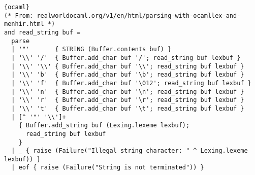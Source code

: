 \begin{lstlisting}{ocaml}
(* From: realworldocaml.org/v1/en/html/parsing-with-ocamllex-and-menhir.html *)
and read_string buf =
  parse
  | '"'       { STRING (Buffer.contents buf) }
  | '\\' '/'  { Buffer.add_char buf '/'; read_string buf lexbuf }
  | '\\' '\\' { Buffer.add_char buf '\\'; read_string buf lexbuf }
  | '\\' 'b'  { Buffer.add_char buf '\b'; read_string buf lexbuf }
  | '\\' 'f'  { Buffer.add_char buf '\012'; read_string buf lexbuf }
  | '\\' 'n'  { Buffer.add_char buf '\n'; read_string buf lexbuf }
  | '\\' 'r'  { Buffer.add_char buf '\r'; read_string buf lexbuf }
  | '\\' 't'  { Buffer.add_char buf '\t'; read_string buf lexbuf }
  | [^ '"' '\\']+
    { Buffer.add_string buf (Lexing.lexeme lexbuf);
      read_string buf lexbuf
    }
  | _ { raise (Failure("Illegal string character: " ^ Lexing.lexeme lexbuf)) }
  | eof { raise (Failure("String is not terminated")) }
\end{lstlisting}
